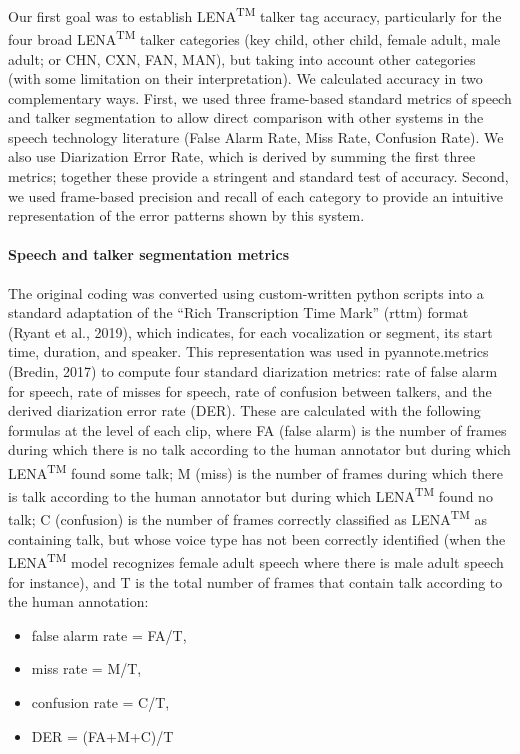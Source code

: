 \documentclass[english,floatsintext,man]{apa6}
\providecommand{\tightlist}{%
  \setlength{\itemsep}{0pt}\setlength{\parskip}{0pt}}
\begin{document}
Our first goal was to establish LENA\textsuperscript{TM} talker tag
accuracy, particularly for the four broad LENA\textsuperscript{TM}
talker categories (key child, other child, female adult, male adult; or
CHN, CXN, FAN, MAN), but taking into account other categories (with some
limitation on their interpretation). We calculated accuracy in two
complementary ways. First, we used three frame-based standard metrics of
speech and talker segmentation to allow direct comparison with other
systems in the speech technology literature (False Alarm Rate, Miss
Rate, Confusion Rate). We also use Diarization Error Rate, which is
derived by summing the first three metrics; together these provide a
stringent and standard test of accuracy. Second, we used frame-based
precision and recall of each category to provide an intuitive
representation of the error patterns shown by this system.

\paragraph{Speech and talker segmentation
metrics}\label{speech-and-talker-segmentation-metrics}

The original coding was converted using custom-written python scripts
into a standard adaptation of the \enquote{Rich Transcription Time Mark}
(rttm) format (Ryant et al., 2019), which indicates, for each
vocalization or segment, its start time, duration, and speaker. This
representation was used in pyannote.metrics (Bredin, 2017) to compute
four standard diarization metrics: rate of false alarm for speech, rate
of misses for speech, rate of confusion between talkers, and the derived
diarization error rate (DER). These are calculated with the following
formulas at the level of each clip, where FA (false alarm) is the number
of frames during which there is no talk according to the human annotator
but during which LENA\textsuperscript{TM} found some talk; M (miss) is
the number of frames during which there is talk according to the human
annotator but during which LENA\textsuperscript{TM} found no talk; C
(confusion) is the number of frames correctly classified as
LENA\textsuperscript{TM} as containing talk, but whose voice type has
not been correctly identified (when the LENA\textsuperscript{TM} model
recognizes female adult speech where there is male adult speech for
instance), and T is the total number of frames that contain talk
according to the human annotation:

\begin{itemize}
\tightlist
\item
  false alarm rate = FA/T,
\item
  miss rate = M/T,
\item
  confusion rate = C/T,
\item
  DER = (FA+M+C)/T
\end{itemize}
\end{document}
